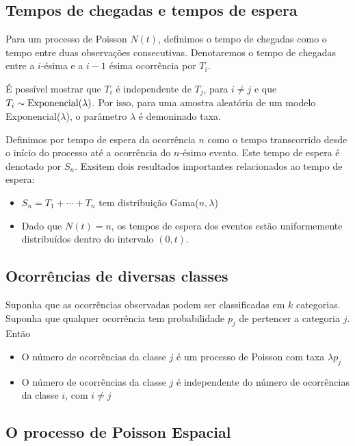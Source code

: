 \documentclass[
  letterpaper,
  DIV=11,
  numbers=noendperiod]{scrreprt}
\theoremstyle{plain}
\theoremstyle{definition}
\theoremstyle{definition}
\theoremstyle{remark}
\begin{document}
\subsection{Tempos de chegadas e tempos de
espera}\label{tempos-de-chegadas-e-tempos-de-espera-1}

Para um processo de Poisson \(N(t)\), definimos o tempo de chegadas como
o tempo entre duas observações consecutivas. Denotaremos o tempo de
chegadas entre a \(i\)-ésima e a \(i-1\) ésima ocorrência por \(T_i\).

É possível mostrar que \(T_i\) é independente de \(T_j\), para
\(i\neq j\) e que \(T_i\sim\hbox{Exponencial}(\lambda)\). Por isso, para
uma amostra aleatória de um modelo Exponencial(\(\lambda\)), o parâmetro
\(\lambda\) é demoninado taxa.

Definimos por tempo de espera da ocorrência \(n\) como o tempo
transcorrido desde o início do processo até a ocorrência do \(n\)-ésimo
evento. Este tempo de espera é denotado por \(S_n\). Exsitem dois
resultados importantes relacionados ao tempo de espera:

\begin{itemize}
\item
  \(S_n=T_1+\cdots+T_n\) tem distribuição Gama(\(n,\lambda\))
\item
  Dado que \(N(t)=n\), os tempos de espera dos eventos estão
  uniformemente distribuídos dentro do intervalo \((0,t)\).
\end{itemize}

\subsection{Ocorrências de diversas
classes}\label{ocorruxeancias-de-diversas-classes-1}

Suponha que as ocorrências observadas podem ser classificadas em \(k\)
categorias. Suponha que qualquer ocorrência tem probabilidade \(p_j\) de
pertencer a categoria \(j\). Então

\begin{itemize}
\item
  O número de ocorrências da classe \(j\) é um processo de Poisson com
  taxa \(\lambda p_j\)
\item
  O número de ocorrências da classe \(j\) é independente do número de
  ocorrências da classe \(i\), com \(i\neq j\)
\end{itemize}

\subsection{O processo de Poisson
Espacial}\label{o-processo-de-poisson-espacial-1}
\end{document}
